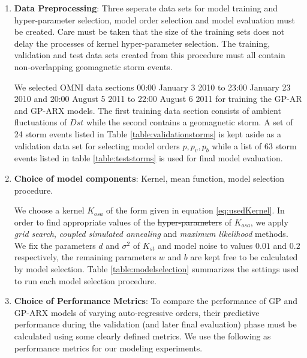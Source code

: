 \documentclass{article}
\providecommand{\DIFadd}[1]{{\protect\color{blue}\uwave{#1}}} %
\providecommand{\DIFdel}[1]{{\protect\color{red}\sout{#1}}}                      %
\providecommand{\DIFaddbegin}{} %
\providecommand{\DIFaddend}{} %
\providecommand{\DIFdelbegin}{} %
\providecommand{\DIFdelend}{} %
\newcommand{\DIFscaledelfig}{0.5}
\newlength{\DIFdelgraphicswidth} %
\newlength{\DIFdelgraphicsheight} %
\newcommand{\DIFaddincludegraphics}[2][]{{\color{blue}\fbox{\DIFOincludegraphics[#1]{#2}}}} %
\newcommand{\DIFdelincludegraphics}[2][]{%
\sbox{\DIFdelgraphicsbox}{\DIFOincludegraphics[#1]{#2}}%
\settoboxwidth{\DIFdelgraphicswidth}{\DIFdelgraphicsbox} %
\settoboxtotalheight{\DIFdelgraphicsheight}{\DIFdelgraphicsbox} %
\scalebox{\DIFscaledelfig}{%
\parbox[b]{\DIFdelgraphicswidth}{\usebox{\DIFdelgraphicsbox}\\[-\baselineskip] \rule{\DIFdelgraphicswidth}{0em}}\llap{\resizebox{\DIFdelgraphicswidth}{\DIFdelgraphicsheight}{%
\setlength{\unitlength}{\DIFdelgraphicswidth}%
\begin{picture}(1,1)%
\thicklines\linethickness{2pt} %
{\color[rgb]{1,0,0}\put(0,0){\framebox(1,1){}}}%
{\color[rgb]{1,0,0}\put(0,0){\line( 1,1){1}}}%
{\color[rgb]{1,0,0}\put(0,1){\line(1,-1){1}}}%
\end{picture}%
}\hspace*{3pt}}} %
} %
\DeclareRobustCommand{\DIFaddbegin}{\DIFOaddbegin \let\includegraphics\DIFaddincludegraphics} %
\DeclareRobustCommand{\DIFaddend}{\DIFOaddend \let\includegraphics\DIFOincludegraphics} %
\DeclareRobustCommand{\DIFdelbegin}{\DIFOdelbegin \let\includegraphics\DIFdelincludegraphics} %
\DeclareRobustCommand{\DIFdelend}{\DIFOaddend \let\includegraphics\DIFOincludegraphics} %
\begin{document}
\begin{enumerate}

\item \textbf{Data Preprocessing}: Three seperate data sets for model training and hyper-parameter selection, model order selection and model evaluation must be created. Care must be taken that the size of the training sets does not delay the processes of kernel hyper-parameter selection. The training, validation and test data sets created from this procedure must all contain non-overlapping geomagnetic storm events. 

We selected OMNI data sections 00:00 January 3 2010 to 23:00 January 23 2010 and 20:00 August 5 2011 to 22:00 August 6 2011 for training the GP-AR and GP-ARX models. The first training data section consists of ambient fluctuations of $Dst$ while the second contains a geomagnetic storm. A set of 24 storm events listed in Table \ref{table:validationstorms} is kept aside as a validation data set for selecting model orders $p, p_v, p_b$ while a list of 63 storm events listed in table \ref{table:teststorms} is used for final model evaluation.


\item \textbf{Choice of model components}:  Kernel, mean function, model selection procedure. 

We choose a kernel $K_{osa}$ of the form given in equation \ref{eq:usedKernel}. In order to find appropriate values of the \DIFdelbegin \DIFdel{hyper-parameters }\DIFdelend \DIFaddbegin \DIFadd{hyperparameters }\DIFaddend of $K_{osa}$, we apply \emph{grid search}, \emph{coupled simulated annealing} and \emph{maximum likelihood} methods. We fix the parameters $d$ and $\sigma^2$ of $K_{st}$ and model noise to values $0.01$ and $0.2$ respectively, the remaining parameters $w$ and $b$ are kept free to be calculated by model selection. Table \ref{table:modelselection} summarizes the settings used to run each model selection procedure.

\item \textbf{Choice of Performance Metrics}: To compare the performance of GP and GP-ARX models of varying auto-regressive orders, their predictive performance during the validation (and later final evaluation) phase must be calculated using some clearly defined metrics. We use the following as performance metrics for our modeling experiments.


\end{enumerate}
\end{document}
